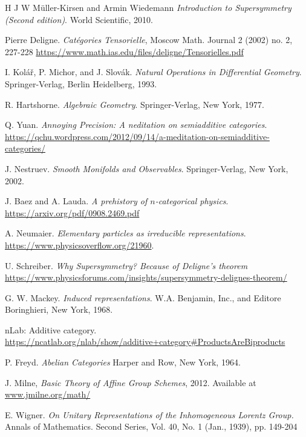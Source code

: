 \documentclass[a4paper]{report}
\theoremstyle{definition}
\theoremstyle{plain}
\theoremstyle{remark}
\begin{document}
\begin{thebibliography}{9}
   H J W M{\"u}ller-Kirsen and Armin Wiedemann
    \textit{Introduction to Supersymmetry (Second edition)}.
    World Scientific, 2010.

   Pierre Deligne.
    \textit{Cat{\'e}gories Tensorielle},
    Moscow Math. Journal 2 (2002) no. 2, 227-228
    \url{https://www.math.ias.edu/files/deligne/Tensorielles.pdf}

   I. Kol\'{a}\v{r}, P. Michor, and J. Slov\'{a}k.
    \textit{Natural Operations in Differential Geometry}.
    Springer-Verlag, Berlin Heidelberg, 1993.

   R. Hartshorne.
    \textit{Algebraic Geometry}.
    Springer-Verlag, New York, 1977.

   Q. Yuan.
    \textit{Annoying Precision: A neditation on semiadditive categories}.
    \url{https://qchu.wordpress.com/2012/09/14/a-meditation-on-semiadditive-categories/}

   J. Nestruev.
    \textit{Smooth Monifolds and Observables}.
    Springer-Verlag, New York, 2002.

   J. Baez and A. Lauda. 
    \textit{A prehistory of $n$-categorical physics}.
    \url{https://arxiv.org/pdf/0908.2469.pdf}

   A. Neumaier.
    \textit{Elementary particles as irreducible representations}.
    \url{https://www.physicsoverflow.org/21960}.

   U. Schreiber.
    \textit{Why Supersymmetry? Because of Deligne's theorem}
    \url{https://www.physicsforums.com/insights/supersymmetry-delignes-theorem/}

   G. W. Mackey.
    \textit{Induced representations}.
    W.A. Benjamin, Inc., and Editore Boringhieri, New York, 1968.

   nLab: Additive category.
    \url{https://ncatlab.org/nlab/show/additive+category#ProductsAreBiproducts}

   P. Freyd.
    \textit{Abelian Categories}
    Harper and Row, New York, 1964.

   J. Milne,
    \textit{Basic Theory of Affine Group Schemes},
    2012. 
    Available at \url{www.jmilne.org/math/}

   E. Wigner.
    \textit{On Unitary Representations of the Inhomogeneous Lorentz Group.}
    Annals of Mathematics. Second Series, Vol. 40, No. 1 (Jan., 1939), pp. 149-204
\end{thebibliography}
\end{document}
